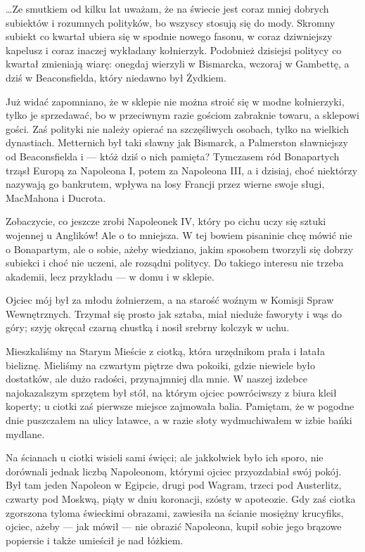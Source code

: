 \documentclass{book}
\begin{document}
…Ze smutkiem od kilku lat uważam, że na świecie jest coraz mniej dobrych subiektów i rozumnych polityków, bo wszyscy stosują się do mody. Skromny subiekt co kwartał ubiera się w spodnie nowego fasonu, w coraz dziwniejszy kapelusz i coraz inaczej wykładany kołnierzyk. Podobnież dzisiejsi politycy co kwartał zmieniają wiarę: onegdaj wierzyli w Bismarcka, wczoraj w Gambettę, a dziś w Beaconsfielda, który niedawno był Żydkiem.

Już widać zapomniano, że w sklepie nie można stroić się w modne kołnierzyki, tylko je sprzedawać, bo w przeciwnym razie gościom zabraknie towaru, a sklepowi gości. Zaś polityki nie należy opierać na szczęśliwych osobach, tylko na wielkich dynastiach. Metternich był taki sławny jak Bismarck, a Palmerston sławniejszy od Beaconsfielda i — któż dziś o nich pamięta? Tymczasem ród Bonapartych trząsł Europą za Napoleona I, potem za Napoleona III, a i dzisiaj, choć niektórzy nazywają go bankrutem, wpływa na losy Francji przez wierne swoje sługi, MacMahona i Ducrota.

Zobaczycie, co jeszcze zrobi Napoleonek IV, który po cichu uczy się sztuki wojennej u Anglików! Ale o to mniejsza. W tej bowiem pisaninie chcę mówić nie o Bonapartym, ale o sobie, ażeby wiedziano, jakim sposobem tworzyli się dobrzy subiekci i choć nie uczeni, ale rozsądni politycy. Do takiego interesu nie trzeba akademii, lecz przykładu — w domu i w sklepie.

Ojciec mój był za młodu żołnierzem, a na starość woźnym w Komisji Spraw Wewnętrznych. Trzymał się prosto jak sztaba, miał nieduże faworyty i wąs do góry; szyję okręcał czarną chustką i nosił srebrny kolczyk w uchu.

Mieszkaliśmy na Starym Mieście z ciotką, która urzędnikom prała i łatała bieliznę. Mieliśmy na czwartym piętrze dwa pokoiki, gdzie niewiele było dostatków, ale dużo radości, przynajmniej dla mnie. W naszej izdebce najokazalszym sprzętem był stół, na którym ojciec powróciwszy z biura kleił koperty; u ciotki zaś pierwsze miejsce zajmowała balia. Pamiętam, że w pogodne dnie puszczałem na ulicy latawce, a w razie słoty wydmuchiwałem w izbie bańki mydlane.

Na ścianach u ciotki wisieli sami święci; ale jakkolwiek było ich sporo, nie dorównali jednak liczbą Napoleonom, którymi ojciec przyozdabiał swój pokój. Był tam jeden Napoleon w Egipcie, drugi pod Wagram, trzeci pod Austerlitz, czwarty pod Moskwą, piąty w dniu koronacji, szósty w apoteozie. Gdy zaś ciotka zgorszona tyloma świeckimi obrazami, zawiesiła na ścianie mosiężny krucyfiks, ojciec, ażeby — jak mówił — nie obrazić Napoleona, kupił sobie jego brązowe popiersie i także umieścił je nad łóżkiem.
\end{document}
